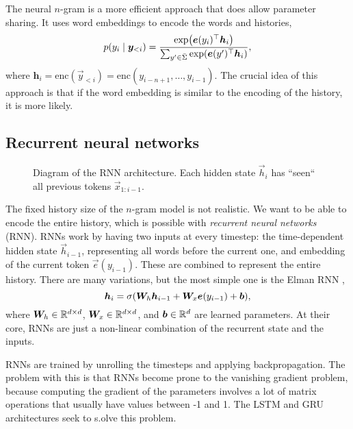The neural $n$-gram \citep{bengio2000neural} is a more efficient approach that does allow parameter
sharing. It uses word embeddings to encode the words and
histories, \[
  p(y_i\mid \bm{y}_{<i}) = \frac{\exp \lft( \transpose{\vec{e}(y_i)} \vec{h}_i \rgt)}{\sum_{y'\in\bar{\Sigma}} \exp \lft( \transpose{\vec{e}(y')} \vec{h}_i \rgt)}
,\]
where $\bm{h}_i = \mathrm{enc}(\vec{y}_{<i}) =
\text{enc}(y_{i-n+1},\ldots,y_{i-1})$. The crucial idea of this approach is that if the word embedding
is similar to the encoding of the history, it is more likely.

\subsection{Recurrent neural networks}

\begin{figure}[ht]
    \centering
    \caption{Diagram of the RNN architecture. Each hidden state $\vec{h}_i$ has
    ``seen`` all previous tokens $\vec{x}_{1:{i-1}}$.}
    \label{fig:rnn}
\end{figure}

The fixed history size of the $n$-gram model is not realistic. We want to be
able to encode the entire history, which is possible with \textit{recurrent
neural networks} (RNN). RNNs work by having two inputs at every timestep: the
time-dependent hidden state $\vec{h}_{i-1}$, representing all words before the
current one, and embedding of the current token $\vec{e}(y_{i-1})$. These are
combined to represent the entire history. There are many variations, but the
most simple one is the Elman RNN \citep{elman1990finding}, \[
  \vec{h}_i = \sigma \lft( \mat{W}_h \vec{h}_{i-1} + \mat{W}_x \vec{e}(y_{i-1}) + \vec{b} \rgt)
,\] 
where $\bm{W}_h \in \mathbb{R}^{d\times d}$, $\bm{W}_x \in \mathbb{R}^{d\times d}$, and
$\bm{b} \in \mathbb{R}^d$ are learned parameters. At their core, RNNs are just a
non-linear combination of the recurrent state and the inputs.

RNNs are trained by unrolling the timesteps and applying backpropagation. The
problem with this is that RNNs become prone to the vanishing gradient problem,
because computing the gradient of the parameters involves a lot of matrix
operations that usually have values between -1 and 1. The LSTM
\citep{hochreiter1997long} and GRU \citep{cho2014learning} architectures seek
to s.olve this problem.

